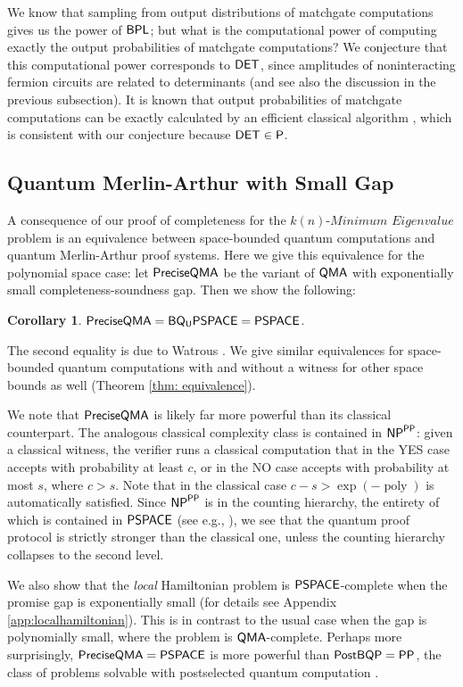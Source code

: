 \documentclass[11pt]{article}
\newtheorem{corollary}[theorem]{Corollary}
\theoremstyle{definition}
\theoremstyle{remark}
\newcommand\DET{{\sf{DET}}}
\newcommand\QMA{{\sf{QMA}}}
\newcommand\PSPACE{{\sf{PSPACE}}}
\newcommand\BQPSPACE{{\sf{BQ_{U}PSPACE}}}
\newcommand\PP{\sf{PP}}
\newcommand\NP{{\sf{NP}}}
\newcommand\PostBQP{{\sf{PostBQP}}}
\newcommand\BPL{{\sf{BPL}}}
\newcommand\preciseQMA{{\sf{PreciseQMA}}}
\newcommand\spechamiltonian[1]{\ensuremath{#1}\textit{-Minimum Eigenvalue}}
\newcommand{\classfont}{\sf}
\DeclareMathOperator{\poly}{poly}
\begin{document}
We know that sampling from output distributions of matchgate computations gives us the power of $\BPL$; but what is the computational power of computing exactly the output probabilities of matchgate computations? We conjecture that this computational power corresponds to $\DET$, since amplitudes of noninteracting fermion circuits are related to determinants (and see also the discussion in the previous subsection). It is known that output probabilities of matchgate computations can be exactly calculated by an efficient classical algorithm \cite{JozMiy08RSPA}, which is consistent with our conjecture because $\DET \in \classfont{P}$.

\subsection{Quantum Merlin-Arthur with Small Gap}
A consequence of our proof of completeness for the $\spechamiltonian{k(n)}$ problem is an equivalence between space-bounded quantum computations and quantum Merlin-Arthur proof systems. Here we give this equivalence for the polynomial space case: let $\preciseQMA$ be the variant of $\QMA$ with exponentially small completeness-soundness gap. Then we show the following:
\begin{corollary} \label{cor: preciseqma}
$\preciseQMA = \BQPSPACE =  \PSPACE$.
\end{corollary}
The second equality is due to Watrous \cite{Watrous99,Watrous03}. We give similar equivalences for space-bounded quantum computations with and without a witness for other space bounds as well (Theorem \ref{thm: equivalence}).

We note that $\preciseQMA$ is likely far more powerful than its classical counterpart. The analogous classical complexity class is contained in $\NP^{\PP}$: given a classical witness, the verifier runs a classical computation that in the YES case accepts with probability at least $c$, or in the NO case accepts with probability at most $s$, where $c>s$. Note that in the classical case $c - s > \exp(-\poly)$ is automatically satisfied. Since $\NP^{\PP}$ is in the counting hierarchy, the entirety of which is contained in $\PSPACE$ (see e.g., \cite{allenderwagner}), we see that the quantum proof protocol is strictly stronger than the classical one, unless the counting hierarchy collapses to the second level.

We also show that the \emph{local} Hamiltonian problem is $\PSPACE$-complete when the promise gap is exponentially small (for details see Appendix \ref{app:localhamiltonian}). This is in contrast to the usual case when the gap is polynomially small, where the problem is $\QMA$-complete. Perhaps more surprisingly, $\preciseQMA = \PSPACE$ is more powerful than $\PostBQP=\PP$, the class of problems solvable with postselected quantum computation \cite{aaronson05}.
\end{document}
